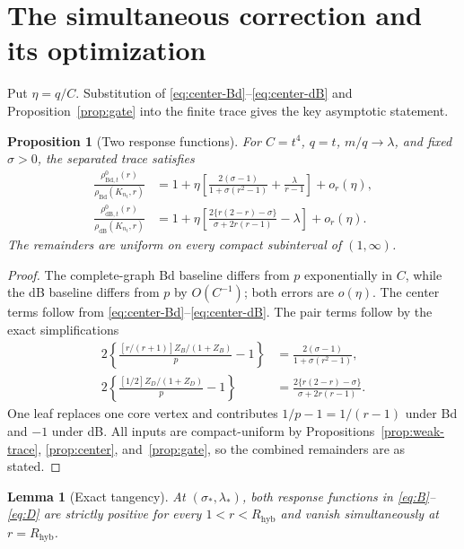 \documentclass[11pt]{article}
\newtheorem{proposition}[theorem]{Proposition}
\newtheorem{lemma}[theorem]{Lemma}
\theoremstyle{definition}
\theoremstyle{remark}
\newcommand{\Bd}{\mathrm{Bd}}
\newcommand{\dB}{\mathrm{dB}}
\newcommand{\Rhyb}{R_{\mathrm{hyb}}}
\begin{document}
\section{The simultaneous correction and its optimization}

Put $\eta=q/C$.  Substitution of
\eqref{eq:center-Bd}--\eqref{eq:center-dB} and
Proposition~\ref{prop:gate} into the finite trace gives the key asymptotic
statement.

\begin{proposition}[Two response functions]
\label{prop:responses}
For $C=t^4$, $q=t$, $m/q\to\lambda$, and fixed $\sigma>0$, the separated
trace satisfies
\begin{align}
 \frac{\rho^0_{\Bd,t}(r)}{\rho_{\Bd}(K_{n_t},r)}
 &=1+\eta\left[
 \frac{2(\sigma-1)}{1+\sigma(r^2-1)}
 +\frac{\lambda}{r-1}\right]+o_r(\eta),\label{eq:B}\\
 \frac{\rho^0_{\dB,t}(r)}{\rho_{\dB}(K_{n_t},r)}
 &=1+\eta\left[
 \frac{2\{r(2-r)-\sigma\}}{\sigma+2r(r-1)}
 -\lambda\right]+o_r(\eta).\label{eq:D}
\end{align}
The remainders are uniform on every compact subinterval of $(1,\infty)$.
\end{proposition}

\begin{proof}
The complete-graph Bd baseline differs from $p$ exponentially in $C$, while
the dB baseline differs from $p$ by $O(C^{-1})$; both errors are
$o(\eta)$.  The center terms follow from
\eqref{eq:center-Bd}--\eqref{eq:center-dB}.  The pair terms follow by the
exact simplifications
\begin{align}
 2\left\{\frac{[r/(r+1)]Z_B/(1+Z_B)}p-1\right\}
 &=\frac{2(\sigma-1)}{1+\sigma(r^2-1)},\\
 2\left\{\frac{[1/2]Z_D/(1+Z_D)}p-1\right\}
 &=\frac{2\{r(2-r)-\sigma\}}{\sigma+2r(r-1)}.
\end{align}
One leaf replaces one core vertex and contributes
$1/p-1=1/(r-1)$ under Bd and $-1$ under dB.
All inputs are compact-uniform by Propositions~\ref{prop:weak-trace},
\ref{prop:center}, and~\ref{prop:gate}, so the combined remainders are as
stated.
\end{proof}

\begin{lemma}[Exact tangency]
\label{lem:tangency}
At $(\sigma_*,\lambda_*)$, both response functions in
\eqref{eq:B}--\eqref{eq:D} are strictly positive for every
$1<r<\Rhyb$ and vanish simultaneously at $r=\Rhyb$.
\end{lemma}
\end{document}
